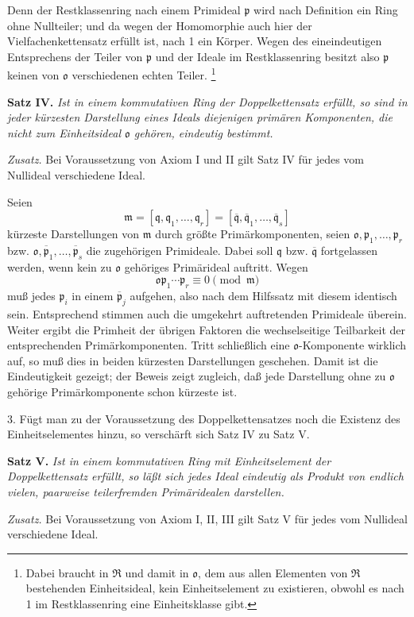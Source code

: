 \documentclass[11pt]{article}
\providecommand{\mR}{\mathfrak{R}}
\providecommand{\mm}{\mathfrak{m}}
\providecommand{\mo}{\mathfrak{o}}
\providecommand{\mpideal}{\mathfrak{p}}
\providecommand{\mq}{\mathfrak{q}}
\providecommand{\mbar}[1]{\overline{#1}}
\begin{document}
Denn der Restklassenring nach einem Primideal $\mpideal$ wird nach Definition ein Ring ohne Nullteiler; und da wegen der Homomorphie auch hier der Vielfachenkettensatz erfüllt ist, nach 1 ein Körper. Wegen des eineindeutigen Entsprechens der Teiler von $\mpideal$ und der Ideale im Restklassenring besitzt also $\mpideal$ keinen von $\mo$ verschiedenen echten Teiler.
\footnote{Dabei braucht in $\mR$ und damit in $\mo$, dem aus allen Elementen von $\mR$ bestehenden Einheitsideal, kein Einheitselement zu existieren, obwohl es nach 1 im Restklassenring eine Einheitsklasse gibt.}

\textbf{Satz IV.} \emph{Ist in einem kommutativen Ring der Doppelkettensatz erfüllt, so sind in jeder kürzesten Darstellung eines Ideals diejenigen primären Komponenten, die nicht zum Einheitsideal $\mo$ gehören, eindeutig bestimmt.}

\emph{Zusatz.} Bei Voraussetzung von Axiom I und II gilt Satz IV für jedes vom Nullideal verschiedene Ideal.

Seien
\[
\mm=[\mq,\mq_1,\ldots,\mq_r]=[\mbar\mq,\mbar\mq_1,\ldots,\mbar\mq_s]
\]
kürzeste Darstellungen von $\mm$ durch größte Primärkomponenten, seien $\mo,\mpideal_1,\ldots,\mpideal_r$ bzw. $\mo,\mbar\mpideal_1,\ldots,\mbar\mpideal_s$ die zugehörigen Primideale. Dabei soll $\mq$ bzw. $\mbar\mq$ fortgelassen werden, wenn kein zu $\mo$ gehöriges Primärideal auftritt. Wegen
\[
\mo\mpideal_1\cdots\mpideal_r\equiv0\pmod{\mm}
\]
muß jedes $\mpideal_i$ in einem $\mbar\mpideal_j$ aufgehen, also nach dem Hilfssatz mit diesem identisch sein. Entsprechend stimmen auch die umgekehrt auftretenden Primideale überein. Weiter ergibt die Primheit der übrigen Faktoren die wechselseitige Teilbarkeit der entsprechenden Primärkomponenten. Tritt schließlich eine $\mo$-Komponente wirklich auf, so muß dies in beiden kürzesten Darstellungen geschehen. Damit ist die Eindeutigkeit gezeigt; der Beweis zeigt zugleich, daß jede Darstellung ohne zu $\mo$ gehörige Primärkomponente schon kürzeste ist.

3. Fügt man zu der Voraussetzung des Doppelkettensatzes noch die Existenz des Einheitselementes hinzu, so verschärft sich Satz IV zu Satz V.

\textbf{Satz V.} \emph{Ist in einem kommutativen Ring mit Einheitselement der Doppelkettensatz erfüllt, so läßt sich jedes Ideal eindeutig als Produkt von endlich vielen, paarweise teilerfremden Primäridealen darstellen.}

\emph{Zusatz.} Bei Voraussetzung von Axiom I, II, III gilt Satz V für jedes vom Nullideal verschiedene Ideal.
\end{document}
